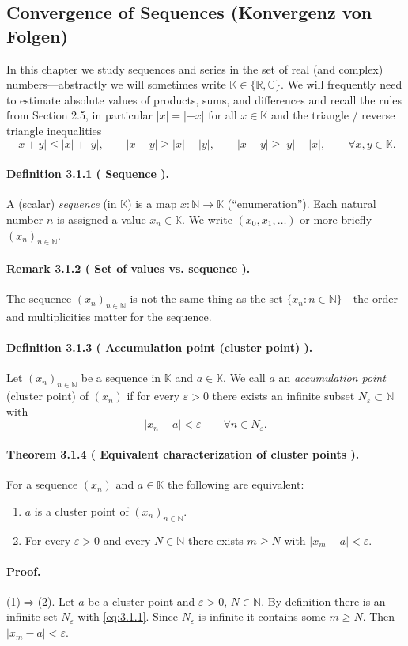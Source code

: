 \documentclass[12pt,a4paper]{article}
\newcommand{\N}{\mathbb{N}}
\newcommand{\R}{\mathbb{R}}
\newcommand{\C}{\mathbb{C}}
\newcommand{\K}{\mathbb{K}} %
\newcommand{\eps}{\varepsilon}
\newcommand{\NumberedDefinition}[3]{%
\paragraph*{Definition #1 ( #2 ).} #3\par}
\newcommand{\NumberedTheorem}[3]{%
\paragraph*{Theorem #1 ( #2 ).} #3\par}
\newcommand{\NumberedRemark}[3]{%
\paragraph*{Remark #1 ( #2 ).} #3\par}
\theoremstyle{plain}
\theoremstyle{definition}
\theoremstyle{remark}
\begin{document}
\subsection{Convergence of Sequences (Konvergenz von Folgen)}

In this chapter we study sequences and series in the set of real (and complex) numbers—abstractly we will sometimes write $\K\in\{\R,\C\}$. We will frequently need to estimate absolute values of products, sums, and differences and recall the rules from Section 2.5, in particular $|x|=|-x|$ for all $x\in\K$ and the triangle / reverse triangle inequalities
\[
	|x+y|\le |x|+|y|,\qquad |x-y|\ge |x|-|y|,\qquad |x-y|\ge |y|-|x|,\qquad \forall x,y\in\K.
\]

\NumberedDefinition{3.1.1}{Sequence}{A (scalar) \emph{sequence} (in $\K$) is a map $x: \N\to\K$ (``enumeration''). Each natural number $n$ is assigned a value $x_n\in\K$. We write $(x_0,x_1,\dots)$ or more briefly $(x_n)_{n\in\N}$.}

\NumberedRemark{3.1.2}{Set of values vs. sequence}{The sequence $(x_n)_{n\in\N}$ is not the same thing as the set $\{x_n: n\in\N\}$—the order and multiplicities matter for the sequence.}

\NumberedDefinition{3.1.3}{Accumulation point (cluster point)}{Let $(x_n)_{n\in\N}$ be a sequence in $\K$ and $a\in\K$. We call $a$ an \emph{accumulation point} (cluster point) of $(x_n)$ if for every $\eps>0$ there exists an infinite subset $N_\eps\subset \N$ with
\begin{equation}\label{eq:3.1.1}\tag{3.1.1}
	|x_n-a| < \eps \qquad \forall n\in N_\eps.
\end{equation}}

\NumberedTheorem{3.1.4}{Equivalent characterization of cluster points}{For a sequence $(x_n)$ and $a\in\K$ the following are equivalent:
\begin{enumerate}[label={(\arabic*)}, leftmargin=*]
	\item $a$ is a cluster point of $(x_n)_{n\in\N}$.
	\item For every $\eps>0$ and every $N\in\N$ there exists $m\ge N$ with $|x_m-a|<\eps$.
\end{enumerate}}

\paragraph{Proof.} (1)$\Rightarrow$(2). Let $a$ be a cluster point and $\eps>0$, $N\in\N$. By definition there is an infinite set $N_\eps$ with \eqref{eq:3.1.1}. Since $N_\eps$ is infinite it contains some $m\ge N$. Then $|x_m-a|<\eps$.
\end{document}
